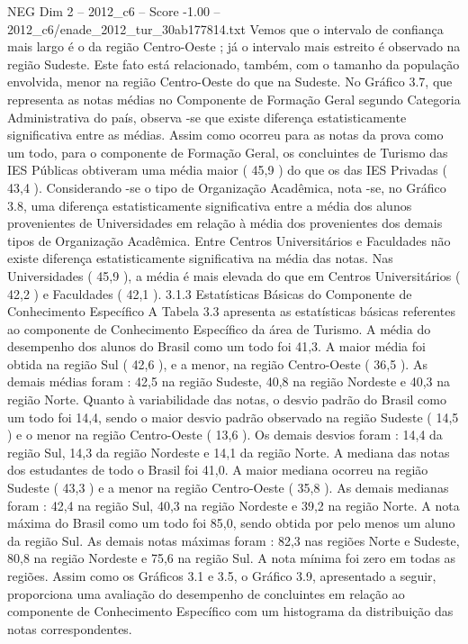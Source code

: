 \begin{textsample}{NEG Dim 2 – 2012\_c6 – Score -1.00 – 2012\_c6/enade\_2012\_tur\_30ab177814.txt}
Vemos que o intervalo de confiança mais largo é o da região Centro-Oeste ; já o intervalo mais estreito é observado na região Sudeste.
Este fato está relacionado, também, com o tamanho da população envolvida, menor na região Centro-Oeste do que na Sudeste.
No Gráfico 3.7, que representa as notas médias no Componente de Formação Geral segundo Categoria Administrativa do país, observa -se que existe diferença estatisticamente significativa entre as médias.
Assim como ocorreu para as notas da prova como um todo, para o componente de Formação Geral, os concluintes de Turismo das IES Públicas obtiveram uma média maior ( 45,9 ) do que os das IES Privadas ( 43,4 ).
Considerando -se o tipo de Organização Acadêmica, nota -se, no Gráfico 3.8, uma diferença estatisticamente significativa entre a média dos alunos provenientes de Universidades em relação à média dos provenientes dos demais tipos de Organização Acadêmica.
Entre Centros Universitários e Faculdades não existe diferença estatisticamente significativa na média das notas.
Nas Universidades ( 45,9 ), a média é mais elevada do que em Centros Universitários ( 42,2 ) e Faculdades ( 42,1 ). 3.1.3 Estatísticas Básicas do Componente de Conhecimento Específico A Tabela 3.3 apresenta as estatísticas básicas referentes ao componente de Conhecimento Específico da área de Turismo.
A média do desempenho dos alunos do Brasil como um todo foi 41,3.
A maior média foi obtida na região Sul ( 42,6 ), e a menor, na região Centro-Oeste ( 36,5 ).
As demais médias foram : 42,5 na região Sudeste, 40,8 na região Nordeste e 40,3 na região Norte.
Quanto à variabilidade das notas, o desvio padrão do Brasil como um todo foi 14,4, sendo o maior desvio padrão observado na região Sudeste ( 14,5 ) e o menor na região Centro-Oeste ( 13,6 ).
Os demais desvios foram : 14,4 da região Sul, 14,3 da região Nordeste e 14,1 da região Norte.
A mediana das notas dos estudantes de todo o Brasil foi 41,0.
A maior mediana ocorreu na região Sudeste ( 43,3 ) e a menor na região Centro-Oeste ( 35,8 ).
As demais medianas foram : 42,4 na região Sul, 40,3 na região Nordeste e 39,2 na região Norte.
A nota máxima do Brasil como um todo foi 85,0, sendo obtida por pelo menos um aluno da região Sul.
As demais notas máximas foram : 82,3 nas regiões Norte e Sudeste, 80,8 na região Nordeste e 75,6 na região Sul.
A nota mínima foi zero em todas as regiões.
Assim como os Gráficos 3.1 e 3.5, o Gráfico 3.9, apresentado a seguir, proporciona uma avaliação do desempenho de concluintes em relação ao componente de Conhecimento Específico com um histograma da distribuição das notas correspondentes.

\end{textsample}

